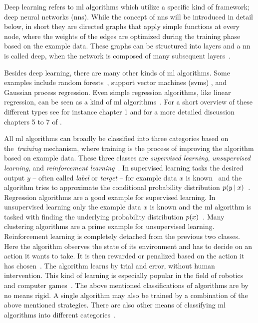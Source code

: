 Deep learning refers to \acrshort{ml} algorithms which utilize a specific kind of framework; deep neural networks (\acrshort{nn}s). While the concept of \acrshort{nn}s will be introduced in detail below, in short they are directed graphs that apply simple functions at every node, where the weights of the edges are optimized during the training phase based on the example data. These graphs can be structured into layers and a \acrshort{nn} is called deep, when the network is composed of many subsequent layers~\cite{Goodfellow:2016:DNN}.

Besides deep learning, there are many other kinds of \acrshort{ml} algorithms. Some examples include random forests~\cite{Ho:1995aaa}, support vector machines (\acrshort{svm}s) \cite{Boser:1992aaa}, and Gaussian process regression. Even simple regression algorithms, like linear regression, can be seen as a kind of \acrshort{ml} algorithms~\cite{Geron:2017aaa}. 
For a short overview of these different types see for instance chapter 1 and for a more detailed discussion chapters 5 to 7 of \cite{Geron:2017aaa}.

All \acrshort{ml} algorithms can broadly be classified into three categories based on the~\emph{training} mechanism, where training is the process of improving the algorithm based on example data. These three classes are \emph{supervised learning}, \emph{unsupervised learning}, and \emph{reinforcement learning}~\cite{Goodfellow:2016:DNN, Ghahramani:2004}. In supervised learning tasks the desired output $y$ -- often called \emph{label} or \emph{target} -- for example data $x$ is known~\cite{Geron:2017aaa} and the algorithm tries to approximate the conditional probability distribution $p{\left( y \:\vert\: x \right)}$~\cite{Goodfellow:2016:DNN}. 
Regression algorithms are a good example for supervised learning. In unsupervised learning only the example data $x$ is known and the \acrshort{ml} algorithm is tasked with finding the underlying probability distribution $p{\left( x \right)}$~\cite{Goodfellow:2016:DNN}. 
Many clustering algorithms are a prime example for unsupervised learning. Reinforcement learning is completely detached from the previous two classes. Here the algorithm observes the state of its environment and has to decide on an action it wants to take. It is then rewarded or penalized based on the action it has chosen~\cite{Geron:2017aaa,sutton:2018}. 
The algorithm learns by trial and error, without human intervention. This kind of learning is especially popular in the field of robotics and computer games~\cite{Goodfellow:2016:DNN,Finn:2015aaa,Sallab:2017,Mnih:2015aaa,openai:2019}.
The above mentioned classifications of algorithms are by no means rigid. A single algorithm may also be trained by a combination of the above mentioned strategies. There are also other means of classifying \acrshort{ml} algorithms into different categories~\cite{Geron:2017aaa}.

